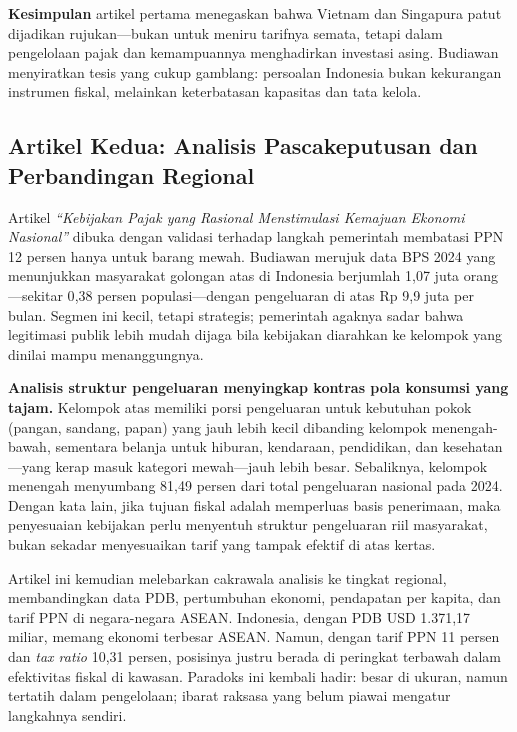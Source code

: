 \textbf{Kesimpulan} artikel pertama menegaskan bahwa Vietnam dan Singapura patut dijadikan rujukan—bukan untuk meniru tarifnya semata, tetapi dalam pengelolaan pajak dan kemampuannya menghadirkan investasi asing. Budiawan menyiratkan tesis yang cukup gamblang: persoalan Indonesia bukan kekurangan instrumen fiskal, melainkan keterbatasan kapasitas dan tata kelola.

\subsection{Artikel Kedua: Analisis Pascakeputusan dan Perbandingan Regional}

Artikel \textit{``Kebijakan Pajak yang Rasional Menstimulasi Kemajuan Ekonomi Nasional''} dibuka dengan validasi terhadap langkah pemerintah membatasi PPN 12 persen hanya untuk barang mewah. Budiawan merujuk data BPS 2024 yang menunjukkan masyarakat golongan atas di Indonesia berjumlah 1{,}07 juta orang---sekitar 0{,}38 persen populasi---dengan pengeluaran di atas Rp 9{,}9 juta per bulan. Segmen ini kecil, tetapi strategis; pemerintah agaknya sadar bahwa legitimasi publik lebih mudah dijaga bila kebijakan diarahkan ke kelompok yang dinilai mampu menanggungnya.

\textbf{Analisis struktur pengeluaran menyingkap kontras pola konsumsi yang tajam.} Kelompok atas memiliki porsi pengeluaran untuk kebutuhan pokok (pangan, sandang, papan) yang jauh lebih kecil dibanding kelompok menengah-bawah, sementara belanja untuk hiburan, kendaraan, pendidikan, dan kesehatan---yang kerap masuk kategori mewah---jauh lebih besar. Sebaliknya, kelompok menengah menyumbang 81{,}49 persen dari total pengeluaran nasional pada 2024. Dengan kata lain, jika tujuan fiskal adalah memperluas basis penerimaan, maka penyesuaian kebijakan perlu menyentuh struktur pengeluaran riil masyarakat, bukan sekadar menyesuaikan tarif yang tampak efektif di atas kertas.

Artikel ini kemudian melebarkan cakrawala analisis ke tingkat regional, membandingkan data PDB, pertumbuhan ekonomi, pendapatan per kapita, dan tarif PPN di negara-negara ASEAN. Indonesia, dengan PDB USD 1.371{,}17 miliar, memang ekonomi terbesar ASEAN. Namun, dengan tarif PPN 11 persen dan \textit{tax ratio} 10{,}31 persen, posisinya justru berada di peringkat terbawah dalam efektivitas fiskal di kawasan. Paradoks ini kembali hadir: besar di ukuran, namun tertatih dalam pengelolaan; ibarat raksasa yang belum piawai mengatur langkahnya sendiri.


